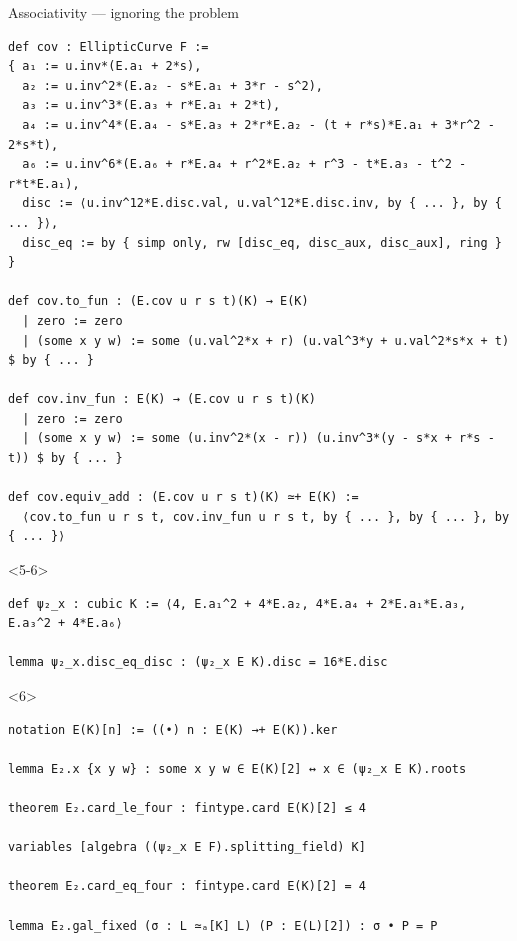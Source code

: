 \documentclass[10pt]{beamer}
\begin{document}
\begin{frame}[fragile, t]{Associativity --- ignoring the problem}
\begin{onlyenv}
\begin{lstlisting}[basicstyle=\scriptsize, frame=single]
def cov : EllipticCurve F :=
{ a₁ := u.inv*(E.a₁ + 2*s),
  a₂ := u.inv^2*(E.a₂ - s*E.a₁ + 3*r - s^2),
  a₃ := u.inv^3*(E.a₃ + r*E.a₁ + 2*t),
  a₄ := u.inv^4*(E.a₄ - s*E.a₃ + 2*r*E.a₂ - (t + r*s)*E.a₁ + 3*r^2 - 2*s*t),
  a₆ := u.inv^6*(E.a₆ + r*E.a₄ + r^2*E.a₂ + r^3 - t*E.a₃ - t^2 - r*t*E.a₁),
  disc := ⟨u.inv^12*E.disc.val, u.val^12*E.disc.inv, by { ... }, by { ... }⟩,
  disc_eq := by { simp only, rw [disc_eq, disc_aux, disc_aux], ring } }

def cov.to_fun : (E.cov u r s t)(K) → E(K)
  | zero := zero
  | (some x y w) := some (u.val^2*x + r) (u.val^3*y + u.val^2*s*x + t) $ by { ... }

def cov.inv_fun : E(K) → (E.cov u r s t)(K)
  | zero := zero
  | (some x y w) := some (u.inv^2*(x - r)) (u.inv^3*(y - s*x + r*s - t)) $ by { ... }

def cov.equiv_add : (E.cov u r s t)(K) ≃+ E(K) :=
  ⟨cov.to_fun u r s t, cov.inv_fun u r s t, by { ... }, by { ... }, by { ... }⟩
\end{lstlisting}
\end{onlyenv}


\begin{onlyenv}<5-6>
\begin{lstlisting}[basicstyle=\scriptsize, frame=single]
def ψ₂_x : cubic K := ⟨4, E.a₁^2 + 4*E.a₂, 4*E.a₄ + 2*E.a₁*E.a₃, E.a₃^2 + 4*E.a₆⟩

lemma ψ₂_x.disc_eq_disc : (ψ₂_x E K).disc = 16*E.disc
\end{lstlisting}
\end{onlyenv}


\begin{onlyenv}<6>
\begin{lstlisting}[basicstyle=\scriptsize, frame=single]
notation E(K)[n] := ((•) n : E(K) →+ E(K)).ker

lemma E₂.x {x y w} : some x y w ∈ E(K)[2] ↔ x ∈ (ψ₂_x E K).roots

theorem E₂.card_le_four : fintype.card E(K)[2] ≤ 4

variables [algebra ((ψ₂_x E F).splitting_field) K]

theorem E₂.card_eq_four : fintype.card E(K)[2] = 4

lemma E₂.gal_fixed (σ : L ≃ₐ[K] L) (P : E(L)[2]) : σ • P = P
\end{lstlisting}
\end{onlyenv}

\end{frame}
\end{document}
